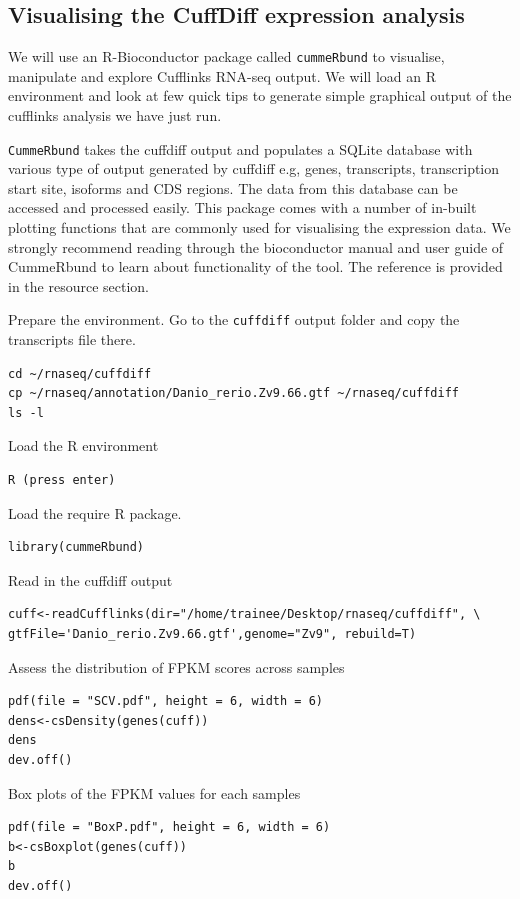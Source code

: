 \begin{bonus}
\section{Visualising the CuffDiff expression analysis}
We will use an R-Bioconductor package called \texttt{cummeRbund} to visualise, manipulate and explore Cufflinks RNA-seq output. We will load an R environment and look at few quick tips to generate simple graphical output of the cufflinks analysis we have just run.

\begin{information}
\texttt{CummeRbund} takes the cuffdiff output and populates a SQLite database with various type of output generated by cuffdiff e.g, genes, transcripts, transcription start site, isoforms and CDS regions. The data from this database can be accessed and processed easily. This package comes with a number of in-built plotting functions that are commonly used for visualising the expression data. We strongly recommend reading through the bioconductor manual and user guide of CummeRbund to learn about functionality of the tool. The reference is provided in the resource section.
\end{information}

\begin{steps}
Prepare the environment. Go to the \texttt{cuffdiff} output folder and copy the transcripts file there.
\begin{lstlisting}
cd ~/rnaseq/cuffdiff
cp ~/rnaseq/annotation/Danio_rerio.Zv9.66.gtf ~/rnaseq/cuffdiff
ls -l
\end{lstlisting}

Load the R environment
\begin{lstlisting}
R (press enter)
\end{lstlisting}
Load the require R package.
\begin{lstlisting}
library(cummeRbund)
\end{lstlisting}
Read in the cuffdiff output
\begin{lstlisting}
cuff<-readCufflinks(dir="/home/trainee/Desktop/rnaseq/cuffdiff", \
gtfFile='Danio_rerio.Zv9.66.gtf',genome="Zv9", rebuild=T)
\end{lstlisting}
Assess the distribution of FPKM scores across samples
\begin{lstlisting}
pdf(file = "SCV.pdf", height = 6, width = 6)
dens<-csDensity(genes(cuff))
dens
dev.off()
\end{lstlisting}
Box plots of the FPKM values for each samples
\begin{lstlisting}
pdf(file = "BoxP.pdf", height = 6, width = 6)
b<-csBoxplot(genes(cuff))
b
dev.off()
\end{lstlisting}




\end{steps}
\end{bonus}
